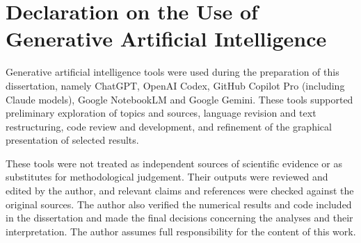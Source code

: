 
\chapter*{Declaration on the Use of Generative Artificial Intelligence}

Generative artificial intelligence tools were used during the preparation of this dissertation, namely ChatGPT, OpenAI Codex, GitHub Copilot Pro (including Claude models), Google NotebookLM and Google Gemini. These tools supported preliminary exploration of topics and sources, language revision and text restructuring, code review and development, and refinement of the graphical presentation of selected results.

These tools were not treated as independent sources of scientific evidence or as substitutes for methodological judgement. Their outputs were reviewed and edited by the author, and relevant claims and references were checked against the original sources. The author also verified the numerical results and code included in the dissertation and made the final decisions concerning the analyses and their interpretation. The author assumes full responsibility for the content of this work.
